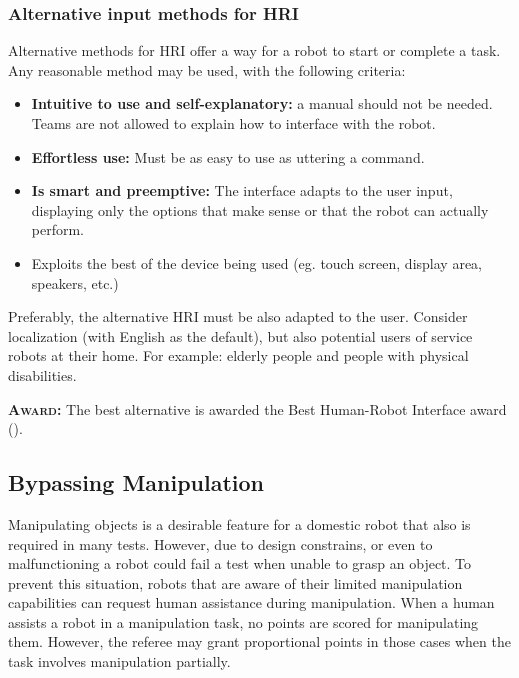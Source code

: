 \subsubsection{Alternative input methods for HRI}
\label{rule:asralternative}
Alternative methods for HRI offer a way for a robot to start or complete a task. Any reasonable method may be used, with the following criteria:
\begin{itemize}
	\item \textbf{Intuitive to use and self-explanatory:} a manual should not be needed. Teams are not allowed to explain how to interface with the robot. %

	\item \textbf{Effortless use:} Must be as easy to use as uttering a command. %

	\item \textbf{Is smart and preemptive:} The interface adapts to the user input, displaying only the options that make sense or that the robot can actually perform.

	\item Exploits the best of the device being used (eg. touch screen, display area, speakers, etc.)
\end{itemize}

Preferably, the alternative HRI must be also adapted to the user. Consider localization (with English as the default), but also potential users of service robots at their home. For example: elderly people and people with physical disabilities.

\textbf{\textsc{Award:}} The best alternative is awarded the Best Human-Robot Interface award ().



\subsection{Bypassing Manipulation}
\label{rule:mancontinue}
Manipulating objects is a desirable feature for a domestic robot that also is required in many tests. However, due to design constrains, or even to malfunctioning a robot could fail a test when unable to grasp an object. To prevent this situation, robots that are aware of their limited manipulation capabilities can request human assistance during manipulation. When a human assists a robot in a manipulation task, no points are scored for manipulating them. However, the referee may grant proportional points in those cases when the task involves manipulation partially.

